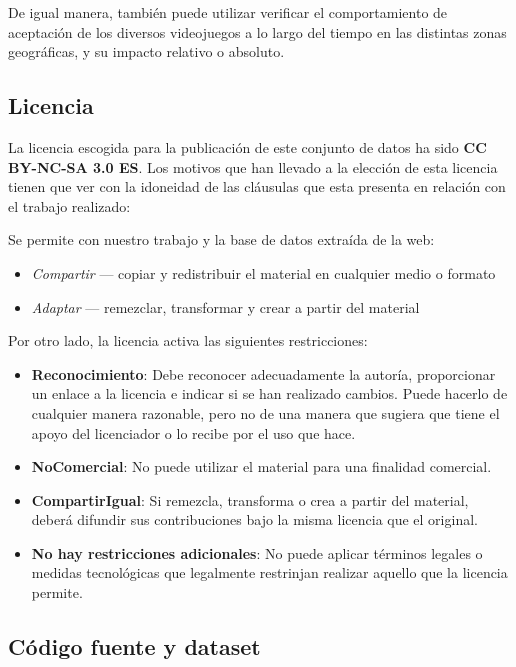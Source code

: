 \documentclass[]{article}
\providecommand{\tightlist}{%
  \setlength{\itemsep}{0pt}\setlength{\parskip}{0pt}}
\begin{document}
De igual manera, también puede utilizar verificar el comportamiento de
aceptación de los diversos videojuegos a lo largo del tiempo en las
distintas zonas geográficas, y su impacto relativo o absoluto.

\subsection{Licencia}\label{licencia}

La licencia escogida para la publicación de este conjunto de datos ha
sido \textbf{CC BY-NC-SA 3.0 ES}. Los motivos que han llevado a la
elección de esta licencia tienen que ver con la idoneidad de las
cláusulas que esta presenta en relación con el trabajo realizado:

Se permite con nuestro trabajo y la base de datos extraída de la web:

\begin{itemize}
\tightlist
\item
  \emph{Compartir} --- copiar y redistribuir el material en cualquier
  medio o formato
\item
  \emph{Adaptar} --- remezclar, transformar y crear a partir del
  material
\end{itemize}

Por otro lado, la licencia activa las siguientes restricciones:

\begin{itemize}
\tightlist
\item
  \textbf{Reconocimiento}: Debe reconocer adecuadamente la autoría,
  proporcionar un enlace a la licencia e indicar si se han realizado
  cambios. Puede hacerlo de cualquier manera razonable, pero no de una
  manera que sugiera que tiene el apoyo del licenciador o lo recibe por
  el uso que hace.
\item
  \textbf{NoComercial}: No puede utilizar el material para una finalidad
  comercial.
\item
  \textbf{CompartirIgual}: Si remezcla, transforma o crea a partir del
  material, deberá difundir sus contribuciones bajo la misma licencia
  que el original.
\item
  \textbf{No hay restricciones adicionales}: No puede aplicar términos
  legales o medidas tecnológicas que legalmente restrinjan realizar
  aquello que la licencia permite.
\end{itemize}

\subsection{Código fuente y dataset}\label{codigo-fuente-y-dataset}
\end{document}
